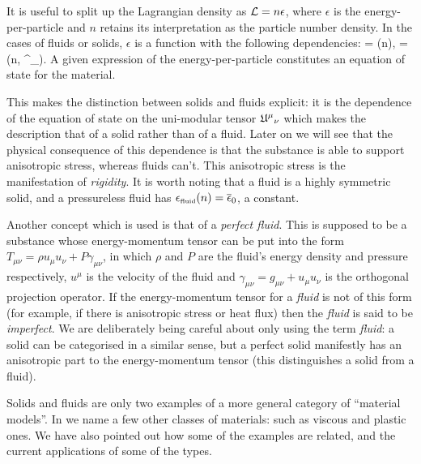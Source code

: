 It is useful to split up the Lagrangian density   as $\mathcal{L} = n \epsilon$, where $\epsilon$ is the energy-per-particle and $n$ retains its interpretation as the particle number density. In the  cases of   fluids or solids, $\epsilon$ is a function with the following dependencies:
\bea
{} = (n),\qquad {} = (n, {\unimod^{\mu}}_{\nu}).
\eea
A given expression of the energy-per-particle constitutes an equation of state for the material. 

This makes the distinction between solids and fluids explicit: it is the dependence of the equation of state on the uni-modular tensor ${\mathfrak{U}^{\mu}}_{\nu}$ which makes the description that of a solid rather than of a fluid. Later on we will see that the physical consequence of this dependence is that the substance is able to support anisotropic stress, whereas fluids can't. This anisotropic stress is the manifestation of \textit{rigidity}. It is worth noting that a fluid is a highly symmetric solid, and a pressureless fluid has ${\epsilon}_{\scriptscriptstyle{\textrm{fluid}}}(n) = \overline{\epsilon}_0$, a constant.





Another  concept which is used is that of a \textit{perfect fluid}. This is supposed to be a substance whose energy-momentum tensor can be put into the form $T_{\mu\nu} = \rho u_{\mu}u_{\nu} + P\gamma_{\mu\nu}$,
in which $\rho$ and $P$ are the  fluid's energy density and pressure respectively, $u^{\mu}$ is the velocity of the fluid and $\gamma_{\mu\nu} = g_{\mu\nu} + u_{\mu}u_{\nu}$ is the orthogonal projection operator. If the energy-momentum tensor for a \textit{fluid} is not of this form (for example, if there is anisotropic stress or heat flux) then the \textit{fluid} is said to be   \textit{imperfect}. We are deliberately being careful about only using the term \textit{fluid}: a solid can be categorised in a similar sense, but a perfect solid manifestly has an anisotropic part to the energy-momentum tensor (this  distinguishes a solid from a fluid).

Solids and fluids are only two examples of a more general category of ``material models''. In  we name a few other classes of materials: such as viscous and plastic ones. We have also pointed out how some of the examples are related, and the current applications of some of the types.



